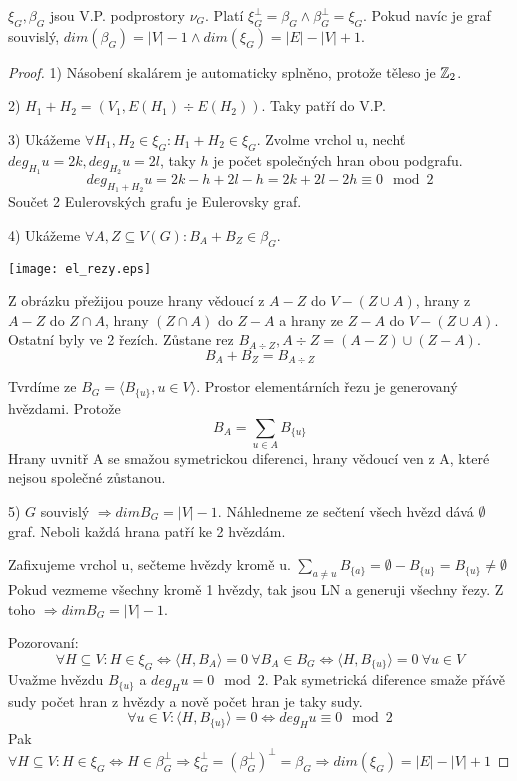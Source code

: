 \begin{theorem}
	$\xi_G, \beta_G$ jsou V.P. podprostory $\nu_G$.
	Platí $\xi_G^{\perp} = \beta_G \land \beta_G^{\perp} = \xi_G$.
	Pokud navíc je graf souvislý, $dim(\beta_G) = |V| - 1 \land dim(\xi_G) = |E| - |V| + 1$.
\end{theorem}
\begin{proof}
	1) Násobení skalárem je automaticky splněno, protože těleso je $\operatorname{\mathbb{Z}}_2$.

	2) $H_1 + H_2 = (V_1, E(H_1) \div E(H_2))$. Taky patří do V.P.

	3) Ukážeme $\forall H_1, H_2 \in \xi_G: H_1 + H_2 \in \xi_G$.
	Zvolme vrchol u, nechť $deg_{H_1} u = 2k, deg_{H_2} u = 2l$, taky $h$ je počet společných hran obou podgrafu.
	\[ deg_{H_1 + H_2} u = 2k - h + 2l - h = 2k + 2l - 2h \equiv 0 \mod2 \]
	Součet 2 Eulerovských grafu je Eulerovsky graf.

	4) Ukážeme $\forall A,Z \subseteq V(G): B_A + B_Z \in \beta_G$.

	\texttt{[image: el\_rezy.eps]}

	Z obrázku přežijou pouze hrany vědoucí z $A - Z$ do $V - (Z\cup A)$, hrany z $A - Z$ do $Z \cap A$, hrany $(Z \cap A)$ do $Z - A$ a hrany ze $Z - A$ do $V - (Z\cup A)$.
	Ostatní byly ve 2 řezích. Zůstane rez $B_{A \div Z}, A \div Z = (A - Z) \cup (Z - A)$.
	\[ B_A + B_Z = B_{A \div Z}\]

	Tvrdíme ze $B_G = \langle B_{\{u\}}, u \in V \rangle$.
	Prostor elementárních řezu je generovaný hvězdami. Protože
	\[ B_A = \sum_{u \in A} B_{\{u\}} \]
	Hrany uvnitř A se smažou symetrickou diferenci, hrany vědoucí ven z A, které nejsou společné zůstanou.

	5) $G$ souvislý $\Rightarrow dim B_G = |V| - 1$. Náhledneme ze sečtení všech hvězd dává $\emptyset$ graf.
	Neboli každá hrana patří ke 2 hvězdám.

	Zafixujeme vrchol u, sečteme hvězdy kromě u. $ \sum_{a \ne u} B_{\{a\}} = \emptyset - B_{\{u\}} = B_{\{u\}} \ne \emptyset $
	Pokud vezmeme všechny kromě 1 hvězdy, tak jsou LN a generuji všechny řezy. Z toho $\Rightarrow dim B_G = |V| - 1$.

	Pozorovaní:
	\[ \forall H \subseteq V: H \in \xi_G \iff \langle H, B_A \rangle = 0 \ \forall B_A \in B_G \iff \langle H, B_{\{u\}} \rangle = 0 \ \forall u \in V \]
	Uvažme hvězdu $B_{\{u\}}$ a $deg_H u = 0 \mod2$. Pak symetrická diference smaže přávě sudy počet hran z hvězdy a nově počet hran je taky sudy.
	\[ \forall u \in V: \langle H, B_{\{u\}} \rangle = 0 \iff deg_H u \equiv 0 \mod2 \]
		Pak $ \forall H \subseteq V: H \in \xi_G \iff H \in \beta_G^{\perp} \Rightarrow \xi_G^{\perp} = (\beta_G^{\perp})^{\perp} = \beta_G \Rightarrow dim(\xi_G) = |E| - |V| + 1 $

\end{proof}
